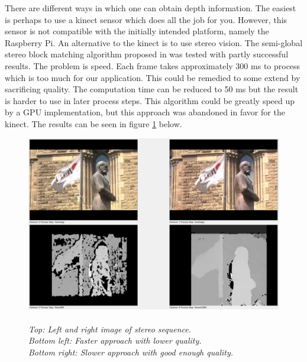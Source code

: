 
There are different ways in which one can obtain depth information. The easiest is perhaps to use a kinect sensor which does all the job for you. However, this sensor is not compatible with the initially intended platform, namely the Raspberry Pi. An alternative to the kinect is to use stereo vision. The semi-global stereo block matching algorithm proposed in \cite{StereoBM} was tested with partly successful results. The problem is speed. Each frame takes approximately 300 ms to process which is too much for our application. This could be remedied to some extend by sacrificing quality. The computation time can be reduced to 50 ms but the result is harder to use in later process steps. This algorithm could be greatly speed up by a GPU implementation, but this approach was abandoned in favor for the kinect. The results can be seen in figure \ref{fig:Stereo} below.

\vspace{1cm}
\begin{figure}[htb]
	\includegraphics[width=\linewidth]{images/stereoComp.png}
	\caption[An example of depth images calculated from a stereo sequence]{\\\textit{
	Top: Left and right image of stereo sequence.\\ 
	Bottom left: Faster approach with lower quality.\\ 
	Bottom right: Slower approach with good enough quality.}}
	\label{fig:Stereo}  %
\end{figure}
\newpage

